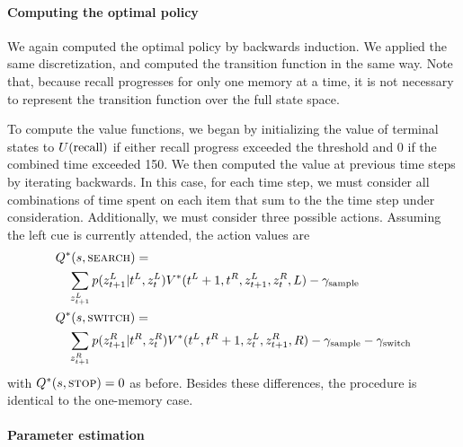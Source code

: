 \paragraph{Computing the optimal policy}

We again computed the optimal policy by backwards induction. We applied the same discretization, and computed the transition function in the same way. Note that, because recall progresses for only one memory at a time, it is not necessary to represent the transition function over the full state space.

To compute the value functions, we began by initializing the value of terminal states to $U({\text{recall}})$ if either recall progress exceeded the threshold and 0 if the combined time exceeded 150. We then computed the value at previous time steps by iterating backwards. In this case, for each time step, we must consider all combinations of time spent on each item that sum to the the time step under consideration. Additionally, we must consider three possible actions. Assuming the left cue is currently attended, the action values are
%
\begin{equation}
\begin{aligned}
  &Q^*(s, \textsc{search}) = \\
    &\quad\sum_{z^{L}_{t+1}} p(z^{L}_{t+1} | t^{L}, z^{L}_t) 
    V^*(t^{L}+1, t^{R}, z^{L}_{t+1}, z^{R}_t, L) - \gamma_\text{sample} \\
  &Q^*(s, \textsc{switch}) = \\
    &\quad\sum_{z^{R}_{t+1}} p(z^{R}_{t+1} | t^{R}, z^{R}_t) 
    V^*(t^{L}, t^{R}+1, z^{L}_{t}, z^{R}_{t+1}, R) - \gamma_\text{sample} - \gamma_\text{switch}\\
\end{aligned}
\end{equation}
%
with $Q^*(s, \textsc{stop}) = 0$ as before. Besides these differences, the procedure is identical to the one-memory case.

\paragraph{Parameter estimation}

